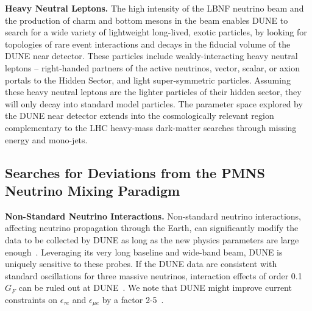 {\bf Heavy Neutral Leptons.}
The high intensity of the LBNF neutrino beam and the production of charm and bottom mesons in the beam enables DUNE to search for a wide variety of lightweight long-lived, exotic particles, by looking for topologies of rare event interactions and decays in the fiducial volume of the DUNE near detector. These particles include weakly-interacting heavy neutral leptons -- right-handed partners of the active neutrinos, vector, scalar, or axion portals to the Hidden Sector, and light super-symmetric particles.  
Assuming these heavy neutral leptons are the lighter particles of their hidden sector, they will only decay into standard model particles.
The parameter space explored by the DUNE near detector extends into the cosmologically relevant region complementary to the LHC heavy-mass dark-matter searches through missing energy and mono-jets. 



\subsection{Searches for Deviations from the PMNS Neutrino Mixing Paradigm}
{\bf Non-Standard Neutrino Interactions.}
Non-standard neutrino interactions, affecting neutrino propagation through the Earth, can significantly modify the data to be collected by DUNE as long as the new physics parameters are large enough~\cite{Masud:2015xva}. Leveraging its very long baseline and wide-band beam, DUNE is uniquely sensitive to  these probes. If the DUNE data are consistent with standard oscillations for three massive neutrinos, interaction effects of order 0.1 $G_F$ can be ruled out at DUNE~\cite{deGouvea:2015ndi,Coloma:2015kiu}. We note that DUNE might improve current constraints on $\epsilon_{\tau e}$ and $\epsilon_{\mu e}$ by a factor 2-5~\cite{Farzan:2017xzy}.

